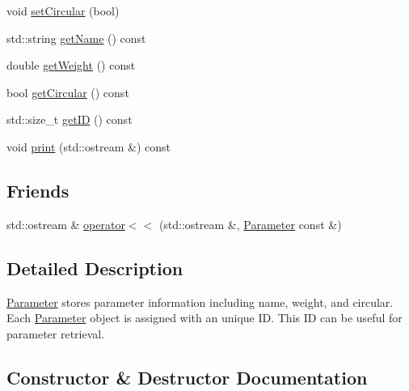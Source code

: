 \begin{DoxyCompactItemize}
\item 
void \mbox{\hyperlink{classanen_par_1_1_parameter_a879fc52a86d9bd101d5c7854cb9e44e5}{set\+Circular}} (bool)
\item 
std\+::string \mbox{\hyperlink{classanen_par_1_1_parameter_ab1e583a8c741abd7b595f0b9aa8b22fb}{get\+Name}} () const
\item 
double \mbox{\hyperlink{classanen_par_1_1_parameter_a0e8c475debbd2729a9ded08dc5c0a032}{get\+Weight}} () const
\item 
bool \mbox{\hyperlink{classanen_par_1_1_parameter_a8a9696a3d050e5eaeead8b59cb953ca8}{get\+Circular}} () const
\item 
std\+::size\+\_\+t \mbox{\hyperlink{classanen_par_1_1_parameter_a5d98f6099de9e07686f44026a6926038}{get\+ID}} () const
\item 
void \mbox{\hyperlink{classanen_par_1_1_parameter_a68b12bf8de84ea9ddfd51c764111d102}{print}} (std\+::ostream \&) const
\end{DoxyCompactItemize}
\subsection*{Friends}
\begin{DoxyCompactItemize}
\item 
std\+::ostream \& \mbox{\hyperlink{classanen_par_1_1_parameter_a062fa105b64c362071304bc5f2eb350a}{operator$<$$<$}} (std\+::ostream \&, \mbox{\hyperlink{classanen_par_1_1_parameter}{Parameter}} const \&)
\end{DoxyCompactItemize}


\subsection{Detailed Description}
\mbox{\hyperlink{classanen_par_1_1_parameter}{Parameter}} stores parameter information including name, weight, and circular. Each \mbox{\hyperlink{classanen_par_1_1_parameter}{Parameter}} object is assigned with an unique ID. This ID can be useful for parameter retrieval. 

\subsection{Constructor \& Destructor Documentation}
\mbox{\label{classanen_par_1_1_parameter_aada3139ee9b50c2acb90d275c72da550}} 

